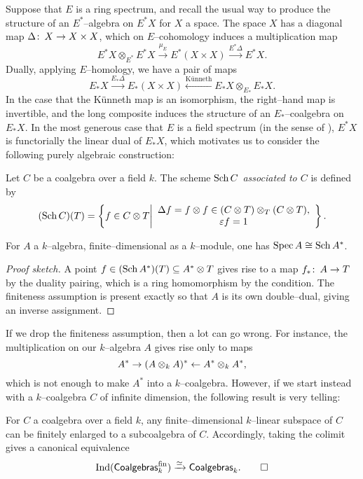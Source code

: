 Suppose that $E$ is a ring spectrum, and recall the usual way to produce the structure of an $E^*$--algebra on $E^* X$ for $X$ a space.  The space $X$ has a diagonal map $\Delta\colon\thinspace X \to X \times X$, which on $E$--cohomology induces a multiplication map \[E^* X \otimes_{E^*} E^* X \xrightarrow{\mu_E} E^*(X \times X) \xrightarrow{E^* \Delta} E^* X.\]  Dually, applying $E$--homology, we have a pair of maps \[E_* X \xrightarrow{E_* \Delta} E_*(X \times X) \xleftarrow{\text{K\"unneth}} E_* X \otimes_{E_*} E_* X.\]  In the case that the K\"unneth map is an isomorphism, the right--hand map is invertible, and the long composite induces the structure of an $E_*$--coalgebra on $E_* X$.  In the most generous case that $E$ is a field spectrum (in the sense of ), $E^* X$ is functorially the linear dual of $E_* X$, which motivates us to consider the following purely algebraic construction:

\begin{definition}
Let $C$ be a coalgebra over a field $k$.  The scheme \emph{$\operatorname{Sch} C$ associated to $C$} is defined by \[(\operatorname{Sch} C)(T) = \left\{f \in C \otimes T \middle| \begin{array}{c} \Delta f = f \otimes f \in (C \otimes T) \otimes_T (C \otimes T), \\ \varepsilon f = 1 \end{array} \right\}.\]
\end{definition}

\begin{lemma}
For $A$ a $k$--algebra, finite--dimensional as a $k$--module, one has $\operatorname{Spec} A \cong \operatorname{Sch} A^*$.
\end{lemma}
\begin{proof}[Proof sketch]
A point $f \in (\operatorname{Sch} A^*)(T) \subseteq A^* \otimes T$ gives rise to a map $f_*\colon\thinspace A \to T$ by the duality pairing, which is a ring homomorphism by the condition.  The finiteness assumption is present exactly so that $A$ is its own double--dual, giving an inverse assignment.
\end{proof}

If we drop the finiteness assumption, then a lot can go wrong.  For instance, the multiplication on our $k$--algebra $A$ gives rise only to maps \[A^* \to (A \otimes_k A)^* \leftarrow A^* \otimes_k A^*,\] which is not enough to make $A^*$ into a $k$--coalgebra.  However, if we start instead with a $k$--coalgebra $C$ of infinite dimension, the following result is very telling:

\begin{lemma}\label{kCoalgebrasAreIndFinite}
For $C$ a coalgebra over a field $k$, any finite--dimensional $k$--linear subspace of $C$ can be finitely enlarged to a subcoalgebra of $C$.  Accordingly, taking the colimit gives a canonical equivalence \[\operatorname{Ind}(\mathsf{Coalgebras}_k^{\mathrm{fin}}) \xrightarrow{\simeq} \mathsf{Coalgebras}_k. \qed\]
\end{lemma}

